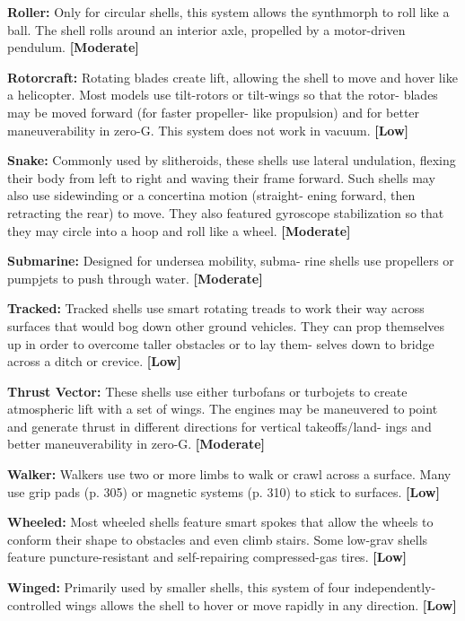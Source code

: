 \textbf{Roller:} Only for circular shells, this system allows 
the synthmorph to roll like a ball. The shell rolls 
around an interior axle, propelled by a motor-driven 
pendulum. \textbf{[Moderate]}

\textbf{Rotorcraft:} Rotating blades create lift, allowing 
the shell to move and hover like a helicopter. Most 
models use tilt-rotors or tilt-wings so that the rotor-
blades may be moved forward (for faster propeller-
like propulsion) and for better maneuverability in 
zero-G. This system does not work in vacuum. \textbf{[Low]}

\textbf{Snake:} Commonly used by slitheroids, these shells 
use lateral undulation, flexing their body from left to 
right and waving their frame forward. Such shells may 
also use sidewinding or a concertina motion (straight-
ening forward, then retracting the rear) to move. They 
also featured gyroscope stabilization so that they may 
circle into a hoop and roll like a wheel. \textbf{[Moderate]}

\textbf{Submarine:} Designed for undersea mobility, subma-
rine shells use propellers or pumpjets to push through 
water. \textbf{[Moderate]}

\textbf{Tracked:} Tracked shells use smart rotating treads to 
work their way across surfaces that would bog down 
other ground vehicles. They can prop themselves up 
in order to overcome taller obstacles or to lay them-
selves down to bridge across a ditch or crevice. \textbf{[Low]}

\textbf{Thrust Vector:} These shells use either turbofans or 
turbojets to create atmospheric lift with a set of wings. 
The engines may be maneuvered to point and generate 
thrust in different directions for vertical takeoffs/land-
ings and better maneuverability in zero-G. \textbf{[Moderate]}

\textbf{Walker:} Walkers use two or more limbs to walk or 
crawl across a surface. Many use grip pads (p. 305) or 
magnetic systems (p. 310) to stick to surfaces. \textbf{[Low]}

\textbf{Wheeled:} Most wheeled shells feature smart 
spokes that allow the wheels to conform their shape 
to obstacles and even climb stairs. Some low-grav 
shells feature puncture-resistant and self-repairing 
compressed-gas tires. \textbf{[Low]}

\textbf{Winged:} Primarily used by smaller shells, this system 
of four independently-controlled wings allows the 
shell to hover or move rapidly in any direction. \textbf{[Low]}


